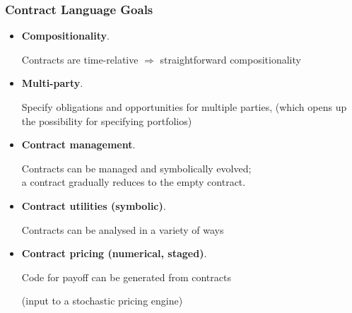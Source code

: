 \documentclass[xcolor=dvipsnames,11pt]{beamer}
\renewcommand{\emph}[1]{\textcolor{structure!90}{#1}}
\begin{document}
\begin{frame}[fragile,t]
    \frametitle{Contract Language Goals}

\begin{itemize}
\item \emph{\textbf{Compositionality}}. 

Contracts are time-relative $\Rightarrow$ straightforward compositionality

\item \emph{\textbf{Multi-party}}.

Specify obligations and opportunities \emph{for multiple parties},
(which opens up the possibility for specifying portfolios)

\item \emph{\textbf{Contract management}}.

\emph{Contracts} can be managed and \emph{symbolically evolved};\\
a contract gradually reduces to the empty contract.

\item \emph{\textbf{Contract utilities (symbolic)}}.

Contracts can be analysed in a variety of ways

\item \emph{\textbf{Contract pricing (numerical, staged)}}.

Code for payoff can be generated from contracts

(\emph{input} to a stochastic \emph{pricing engine})

\end{itemize}

\end{frame} 

\end{document}

